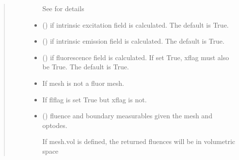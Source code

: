 \documentclass[letterpaper,10pt,english]{sphinxmanual}
\begin{document}
\begin{fulllineitems}
\begin{quote}
\begin{description}
\begin{itemize}
\sphinxAtStartPar
See {\hyperref[\detokenize{_autosummary/nirfasterff.utils.SolverOptions:nirfasterff.utils.SolverOptions}]{}} for details


\item {} 
\sphinxAtStartPar
{} (\sphinxstyleliteralemphasis{\sphinxupquote{, }}) \textendash{} if intrinsic excitation field is calculated. The default is True.

\item {} 
\sphinxAtStartPar
{} (\sphinxstyleliteralemphasis{\sphinxupquote{, }}) \textendash{} if intrinsic emission field is calculated. The default is True.

\item {} 
\sphinxAtStartPar
{} (\sphinxstyleliteralemphasis{\sphinxupquote{, }}) \textendash{} if fluorescence field is calculated. If set True, xflag must also be True. The default is True.

\end{itemize}

\begin{itemize}
\item {} 
\sphinxAtStartPar
{} \textendash{} If mesh is not a fluor mesh.

\item {} 
\sphinxAtStartPar
{} \textendash{} If flflag is set True but xflag is not.

\end{itemize}

\sphinxAtStartPar
\begin{itemize}
\item {} 
\sphinxAtStartPar
{} () \textendash{} fluence and boundary measurables given the mesh and optodes.

\sphinxAtStartPar
If mesh.vol is defined, the returned fluences will be in volumetric space


\end{itemize}
\end{description}
\end{quote}
\end{fulllineitems}
\end{document}

